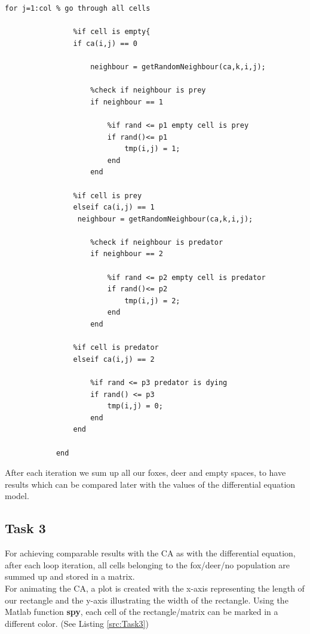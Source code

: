 \documentclass[a4paper,12pt]{article}
\begin{document}
\begin{lstlisting}[frame = single, caption = Implementation of the CA rules applied, label=src:Task2]
for j=1:col % go through all cells

                %if cell is empty{
                if ca(i,j) == 0

                    neighbour = getRandomNeighbour(ca,k,i,j);

                    %check if neighbour is prey
                    if neighbour == 1

                        %if rand <= p1 empty cell is prey
                        if rand()<= p1
                            tmp(i,j) = 1;
                        end
                    end

                %if cell is prey    
                elseif ca(i,j) == 1
                 neighbour = getRandomNeighbour(ca,k,i,j);

                    %check if neighbour is predator
                    if neighbour == 2

                        %if rand <= p2 empty cell is predator
                        if rand()<= p2
                            tmp(i,j) = 2;
                        end
                    end

                %if cell is predator
                elseif ca(i,j) == 2

                    %if rand <= p3 predator is dying
                    if rand() <= p3
                        tmp(i,j) = 0;
                    end
                end

            end
\end{lstlisting}            

After each iteration we sum up all our foxes, deer and empty spaces, to have results which can be compared later with the values of the differential equation model.



\subsection{Task 3}
For achieving comparable results with the CA as with the differential equation, after each loop iteration, all cells belonging to the fox/deer/no population are summed up and stored in a matrix.\\

For animating the CA, a plot is created with the x-axis representing the length of our rectangle and the y-axis illustrating the width of the rectangle. Using the Matlab function \textbf{spy}, each cell of the rectangle/matrix can be marked in a different color. (See Listing \ref{src:Task3})\\
\end{document}
